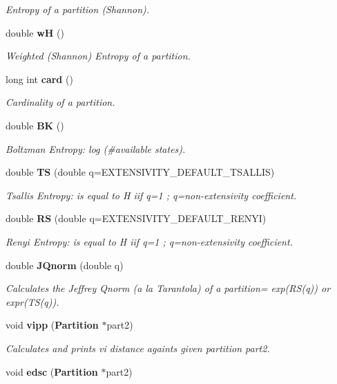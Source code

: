 \begin{CompactItemize}
\begin{CompactList}\small\item\em Entropy of a partition (Shannon). \item\end{CompactList}\item 
double {\bf w\-H} ()\label{classPartition_a33}

\begin{CompactList}\small\item\em Weighted (Shannon) Entropy of a partition. \item\end{CompactList}\item 
long int {\bf card} ()\label{classPartition_a34}

\begin{CompactList}\small\item\em Cardinality of a partition. \item\end{CompactList}\item 
double {\bf BK} ()\label{classPartition_a35}

\begin{CompactList}\small\item\em Boltzman Entropy: log (\#available states). \item\end{CompactList}\item 
double {\bf TS} (double q=EXTENSIVITY\_\-DEFAULT\_\-TSALLIS)\label{classPartition_a36}

\begin{CompactList}\small\item\em Tsallis Entropy: is equal to H iif q=1 ; q=non-extensivity coefficient. \item\end{CompactList}\item 
double {\bf RS} (double q=EXTENSIVITY\_\-DEFAULT\_\-RENYI)\label{classPartition_a37}

\begin{CompactList}\small\item\em Renyi Entropy: is equal to H iif q=1 ; q=non-extensivity coefficient. \item\end{CompactList}\item 
double {\bf JQnorm} (double q)\label{classPartition_a38}

\begin{CompactList}\small\item\em Calculates the Jeffrey Qnorm (a la Tarantola) of a partition= exp(RS(q)) or expr(TS(q)). \item\end{CompactList}\item 
void {\bf vipp} ({\bf Partition} $\ast$part2)
\begin{CompactList}\small\item\em Calculates and prints vi distance againts given partition part2. \item\end{CompactList}\item 
void {\bf edsc} ({\bf Partition} $\ast$part2)\label{classPartition_a40}


\end{CompactItemize}

